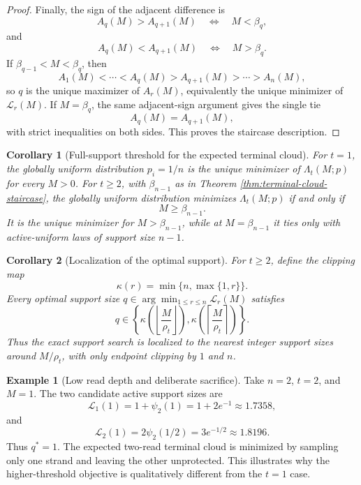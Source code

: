 \documentclass[11pt]{article}
\newtheorem{corollary}{Corollary}
\theoremstyle{definition}
\newtheorem{example}{Example}
\theoremstyle{remark}
\newcommand{\1}{\mathbf 1}
\begin{document}
\begin{proof}
Finally, the sign of the adjacent difference is
\[
  A_q(M)>A_{q+1}(M)
  \quad\Longleftrightarrow\quad
  M<\beta_q,
\]
and
\[
  A_q(M)<A_{q+1}(M)
  \quad\Longleftrightarrow\quad
  M>\beta_q.
\]
If \(\beta_{q-1}<M<\beta_q\), then
\[
  A_1(M)<\cdots<A_q(M)>A_{q+1}(M)>\cdots>A_n(M),
\]
so \(q\) is the unique maximizer of \(A_r(M)\), equivalently the unique minimizer of \(\mathcal L_r(M)\).  If \(M=\beta_q\), the same adjacent-sign argument gives the single tie
\[
  A_q(M)=A_{q+1}(M),
\]
with strict inequalities on both sides.  This proves the staircase description.
\end{proof}

\begin{corollary}[Full-support threshold for the expected terminal cloud]
For \(t=1\), the globally uniform distribution \(p_i=1/n\) is the unique minimizer of \(\Lambda_t(M;p)\) for every \(M>0\).  For \(t\ge2\), with \(\beta_{n-1}\) as in Theorem \ref{thm:terminal-cloud-staircase}, the globally uniform distribution minimizes \(\Lambda_t(M;p)\) if and only if
\[
  M\ge \beta_{n-1}.
\]
It is the unique minimizer for \(M>\beta_{n-1}\), while at \(M=\beta_{n-1}\) it ties only with active-uniform laws of support size \(n-1\).
\end{corollary}

\begin{corollary}[Localization of the optimal support]
For \(t\ge2\), define the clipping map
\[
  \kappa(r)=\min\{n,\max\{1,r\}\}.
\]
Every optimal support size \(q\in\arg\min_{1\le r\le n}\mathcal L_r(M)\) satisfies
\[
  q\in
  \left\{
  \kappa\!\left(\left\lfloor\frac{M}{\rho_t}\right\rfloor\right),
  \kappa\!\left(\left\lceil\frac{M}{\rho_t}\right\rceil\right)
  \right\}.
\]
Thus the exact support search is localized to the nearest integer support sizes around \(M/\rho_t\), with only endpoint clipping by \(1\) and \(n\).
\end{corollary}

\begin{example}[Low read depth and deliberate sacrifice]
Take \(n=2\), \(t=2\), and \(M=1\).  The two candidate active support sizes are
\[
  \mathcal L_1(1)=1+\psi_2(1)=1+2e^{-1}\approx1.7358,
\]
and
\[
  \mathcal L_2(1)=2\psi_2(1/2)=3e^{-1/2}\approx1.8196.
\]
Thus \(q^*=1\).  The expected two-read terminal cloud is minimized by sampling only one strand and leaving the other unprotected.  This illustrates why the higher-threshold objective is qualitatively different from the \(t=1\) case.
\end{example}
\end{document}
